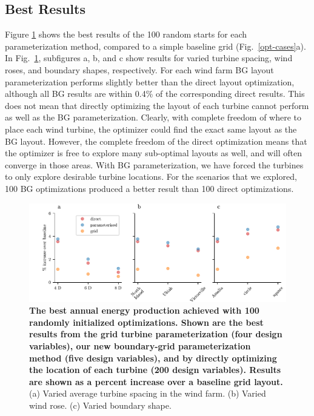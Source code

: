 \documentclass[wes, manuscript]{copernicus}
\begin{document}
\subsection{Best Results}
\label{max-results}
Figure \ref{results-max} 
shows the best results of the 100 random starts for each parameterization method, compared to a simple baseline grid (Fig.~\ref{opt-cases}a). In Fig.~\ref{results-max}, subfigures a, b, and c show results for varied turbine spacing, wind roses, and boundary shapes, respectively. For each wind farm BG layout parameterization performs slightly better than the direct layout optimization, although all BG results are within 0.4\% of the corresponding direct results. This does not mean that directly optimizing the layout of each turbine cannot perform as well as the BG parameterization. Clearly, with complete freedom of where to place each wind turbine, the optimizer could find the exact same layout as the BG layout. However, the complete freedom of the direct optimization means that the optimizer is free to explore many sub-optimal layouts as well, and will often converge in those areas. With BG parameterization, we have forced the turbines to only explore desirable turbine locations. For the scenarios that we explored, 100 BG optimizations produced a better result  than 100 direct optimizations.
%
\begin{figure}
\centering
\includegraphics{paper-figures/results_maxR1.pdf}
\caption{\textbf{The best annual energy production achieved with 100 randomly initialized optimizations. Shown are the best results from the grid turbine parameterization (four design variables), our new boundary-grid parameterization method (five design variables), and by directly optimizing the location of each turbine (200 design variables). Results are shown as a percent increase over a baseline grid layout.} (a) Varied average turbine spacing in the wind farm. (b) Varied wind rose. (c) Varied boundary shape.}
\label{results-max}
\end{figure}
\end{document}
